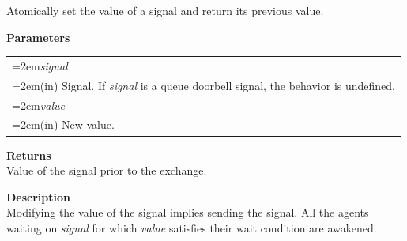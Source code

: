 \documentclass[final]{book}
\newcommand{\hsaarg}[1]{\textit{#1}}
\begin{document}
\vspace{-2mm}Atomically set the value of a signal and return its previous value.

\noindent\textbf{Parameters}\\[-6mm]
\noindent\begin{longtable}{@{}>{\hangindent=2em}p{\textwidth}}
\hsaarg{signal}\\\hspace{2em}(in) Signal. If \textit{signal} is a queue doorbell signal, the behavior is undefined.\\[2mm]
\hsaarg{value}\\\hspace{2em}(in) New value.
\end{longtable}
\vspace{-5mm}\noindent\textbf{Returns}\\[1mm]
Value of the signal prior to the exchange.

\noindent\textbf{Description}\\[1mm]
Modifying the value of the signal implies sending the signal. All the agents waiting on \textit{signal} for which \textit{value} satisfies their wait condition are awakened.
\end{document}
